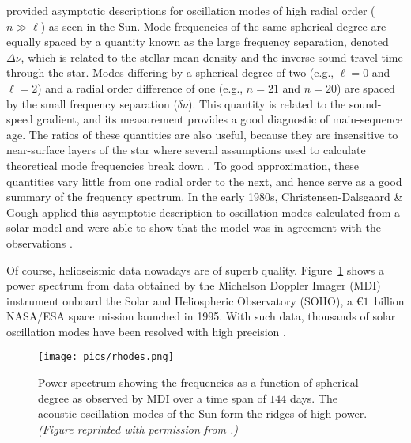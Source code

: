 \citet{1980ApJS...43..469T} provided asymptotic descriptions for oscillation modes of high radial order (${n\gg\ell}$) as seen in the Sun. 
Mode frequencies of the same spherical degree are equally spaced by a quantity known as the large frequency separation, denoted ${\Delta\nu}$, which is related to the stellar mean density and the inverse sound travel time through the star. 
Modes differing by a spherical degree of two (e.g., ${\ell=0}$ and ${\ell=2}$) and a radial order difference of one (e.g., ${n=21}$ and ${n=20}$) are spaced by the small frequency separation (${\delta\nu}$). 
This quantity is related to the sound-speed gradient, and its measurement provides a good diagnostic of main-sequence age. 
The ratios of these quantities are also useful, because they are insensitive to near-surface layers of the star where several assumptions used to calculate theoretical mode frequencies break down \citep[e.g.,][]{2003A&A...411..215R}. 
To good approximation, these quantities vary little from one radial order to the next, and hence serve as a good summary of the frequency spectrum. 
In the early 1980s, Christensen-Dalsgaard \& Gough applied this asymptotic description to oscillation modes calculated from a solar model and were able to show that the model was in agreement with the observations \citep[e.g.,][]{2002RvMP...74.1073C}. 

Of course, helioseismic data nowadays are of superb quality. 
Figure~\ref{fig:rhodes-mdi} shows a power spectrum from data obtained by the Michelson Doppler Imager (MDI) instrument onboard the Solar and Heliospheric Observatory (SOHO), a \euro$1$~billion NASA/ESA space mission launched in 1995. 
With such data, thousands of solar oscillation modes have been resolved with high precision \citep[e.g.,][]{1997SoPh..175..287R}. 

\begin{figure}
    \centering
    \texttt{[image: pics/rhodes.png]}
    \caption[Solar power spectrum from MDI]{Power spectrum showing the frequencies as a function of spherical degree as observed by MDI over a time span of $144$ days. 
    The acoustic oscillation modes of the Sun form the ridges of high power. 
        \emph{(Figure reprinted with permission from \citealt{1997SoPh..175..287R}.)}
        \label{fig:rhodes-mdi}}
\end{figure}



